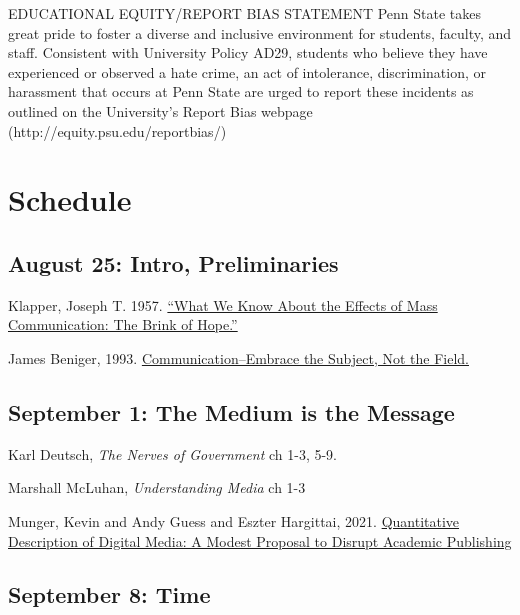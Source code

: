 \vspace{-.1in}\documentclass[11pt]{article}
\begin{document}
EDUCATIONAL EQUITY/REPORT BIAS STATEMENT 
Penn State takes great pride to foster a diverse and inclusive environment for students, faculty, and staff. Consistent with University Policy AD29, students who believe they have experienced or observed a hate crime, an act of intolerance, discrimination, or harassment that occurs at Penn State are urged to report these incidents as outlined on the University’s Report Bias webpage (http://equity.psu.edu/reportbias/)



\clearpage
\section*{Schedule}




\subsection*{August 25: Intro, Preliminaries}


\noindent Klapper, Joseph T. 1957. \href{https://github.com/kmunger/MSMP21/blob/main/klapper.pdf}{``What We Know About the Effects of Mass Communication: The Brink of Hope.''}


\noindent James Beniger, 1993. \href{https://github.com/kmunger/MSMP21/blob/main/beniger.pdf}{Communication--Embrace the Subject, Not the Field.}

\subsection*{September 1: The Medium is the Message}


Karl Deutsch, \textit{The Nerves of Government} ch 1-3, 5-9.

\noindent Marshall McLuhan, \textit{Understanding Media} ch 1-3


\noindent Munger, Kevin and Andy Guess and Eszter Hargittai, 2021. \href{https://journalqd.org/article/view/2713/1825}{Quantitative Description of Digital Media: A Modest Proposal to Disrupt Academic Publishing}


\subsection*{September 8: Time}
\end{document}
